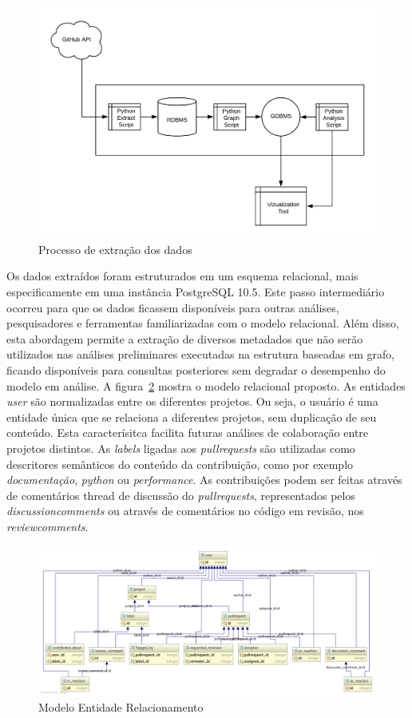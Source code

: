 \documentclass[sigconf]{acmart}
\begin{document}
\begin{figure}[!htbp]
 \includegraphics[width=\columnwidth]{processo_extracao}
 \caption{Processo de extração dos dados}\label{fig:processo_extracao}
\end{figure}

Os dados extraídos foram estruturados em um esquema relacional, mais especificamente em uma instância PostgreSQL 10.5. Este passo intermediário ocorreu para que os dados ficassem disponíveis para outras análises, pesquisadores e ferramentas familiarizadas com o modelo relacional. Além disso, esta abordagem permite a extração de diversos metadados que não serão utilizados nas análises preliminares executadas na estrutura baseadas em grafo, ficando disponíveis para consultas posteriores sem degradar o desempenho do modelo em análise. A figura~\ref{fig:mer} mostra o modelo relacional proposto. As entidades \textit{user} são normalizadas entre os diferentes projetos. Ou seja, o usuário é uma entidade única que se relaciona a diferentes projetos, sem duplicação de seu conteúdo. Esta caracterísitca facilita futuras análises de colaboração entre projetos distintos. As \textit{labels} ligadas aos \textit{pullrequests} são utilizadas como descritores semânticos do conteúdo da contribuição, como por exemplo \textit{documentação}, \textit{python} ou \textit{performance}. As contribuições podem ser feitas através de comentários thread de discussão do \textit{pullrequests}, representados pelos \textit{discussioncomments} ou através de comentários no código em revisão, nos \textit{reviewcomments}.

\begin{figure}[!htbp]
 \includegraphics[width=\textwidth]{mer}
 \caption{Modelo Entidade Relacionamento}\label{fig:mer}
\end{figure}
\end{document}
